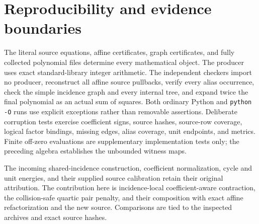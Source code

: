\section{Reproducibility and evidence boundaries}
The literal source equations, affine certificates, graph certificates,
and fully collected polynomial files determine every mathematical object.
The producer uses exact standard-library integer arithmetic. The independent
checkers import no producer, reconstruct all affine source pullbacks,
verify every alias occurrence, check the simple incidence graph and every
internal tree, and expand twice the final polynomial as an actual sum of
squares. Both ordinary Python and \texttt{python -O} runs use explicit
exceptions rather than removable assertions. Deliberate corruption tests
exercise coefficient signs, source hashes, source-row coverage, logical
factor bindings, missing edges, alias coverage, unit endpoints, and metrics.
Finite off-zero evaluations are supplementary implementation tests only;
the preceding algebra establishes the unbounded witness maps.

The incoming shared-incidence construction, coefficient normalization,
cycle and unit energies, and their supplied source calibration retain
their original attribution. The contribution here is incidence-local
coefficient-aware contraction, the collision-safe quartic pair penalty,
and their composition with exact affine refactorization and the new source.
Comparisons are tied to the inspected archives and exact source hashes.
